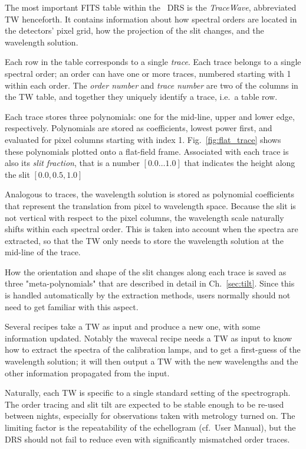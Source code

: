 The most important FITS table within the \instrument\ DRS is the
\emph{TraceWave}, abbreviated TW henceforth. It contains information about how
spectral orders are located in the detectors' pixel grid, how the projection of
the slit changes, and the wavelength solution.

Each row in the table corresponds to a single \emph{trace}. Each trace belongs
to a single spectral order; an order can have one or more traces, numbered
starting with 1 within each order. The \emph{order number} and \emph{trace
number} are two of the columns in the TW table, and together they uniquely
identify a trace, i.e.~a table row.

Each trace stores three polynomials: one for the mid-line, upper and lower edge,
respectively. Polynomials are stored as coefficients, lowest power first, and
evaluated for pixel columns starting with index 1. Fig.~\ref{fig:flat_trace}
shows these polynomials plotted onto a flat-field frame. Associated with each trace is also its \emph{slit fraction}, that is a number $[0.0\ldots 1.0]$ that indicates the height along the slit $[ 0.0, 0.5, 1.0 ]$

Analogous to traces, the wavelength solution is stored as polynomial coefficients
that represent the translation from pixel to wavelength space. Because the slit
is not vertical with respect to the pixel columns, the wavelength scale
naturally shifts within each spectral order. This is taken into account when the
spectra are extracted, so that the TW only needs to store the wavelength
solution at the mid-line of the trace.

How the orientation and shape of the slit changes along each trace is saved as
three "meta-polynomials" that are described in detail in Ch.~\ref{sec:tilt}.
Since this is handled automatically by the extraction methods, users normally
should not need to get familiar with this aspect.

Several recipes take a TW as input and produce a new one, with some information
updated. Notably the wavecal recipe needs a TW as input to know how to extract
the spectra of the calibration lamps, and to get a first-guess of the
wavelength solution; it will then output a TW with the new wavelengths and
the other information propagated from the input.

Naturally, each TW is specific to a single standard setting of the spectrograph.
The order tracing and slit tilt are expected to be stable enough to be re-used
between nights, especially for observations taken with metrology turned on. The
limiting factor is the repeatability of the echellogram (cf.~User Manual), but
the DRS should not fail to reduce even with significantly mismatched order
traces.

